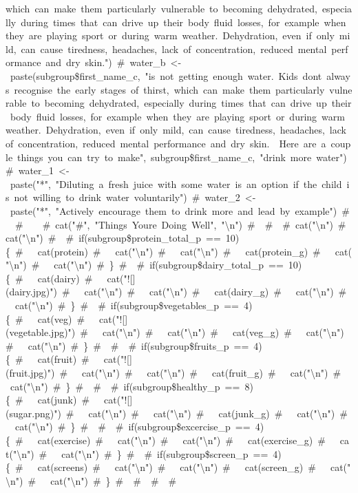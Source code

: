 \documentclass[]{article}
\begin{document}
which\ can\ make\ them\ particularly\ vulnerable\ to\ becoming\ dehydrated,\ especially\ during\ times\ that\ can\ drive\ up\ their\ body\ fluid\ losses,\ for\ example\ when\ they\ are\ playing\ sport\ or\ during\ warm\ weather.\ Dehydration,\ even\ if\ only\ mild,\ can\ cause\ tiredness,\ headaches,\ lack\ of\ concentration,\ reduced\ mental\ performance\ and\ dry\ skin.")\ \#\ water\_b\ \textless{}-\ paste(subgroup\$first\_name\_c,\ "is\ not\ getting\ enough\ water.\ Kids\ don\textquotesingle{}t\ always\ recognise\ the\ early\ stages\ of\ thirst,\ which\ can\ make\ them\ particularly\ vulnerable\ to\ becoming\ dehydrated,\ especially\ during\ times\ that\ can\ drive\ up\ their\ body\ fluid\ losses,\ for\ example\ when\ they\ are\ playing\ sport\ or\ during\ warm\ weather.\ Dehydration,\ even\ if\ only\ mild,\ can\ cause\ tiredness,\ headaches,\ lack\ of\ concentration,\ reduced\ mental\ performance\ and\ dry\ skin.\ \ Here\ are\ a\ couple\ things\ you\ can\ try\ to\ make",\ subgroup\$first\_name\_c,\ "drink\ more\ water")\ \#\ water\_1\ \textless{}-\ paste("*",\ "Diluting\ a\ fresh\ juice\ with\ some\ water\ is\ an\ option\ if\ the\ child\ is\ not\ willing\ to\ drink\ water\ voluntarily")\ \#\ water\_2\ \textless{}-\ paste("*",\ "Actively\ encourage\ them\ to\ drink\ more\ and\ lead\ by\ example")\ \#\ \ \#\ \ \ \ \#\ cat("\#",\ "Things\ You\textquotesingle{}re\ Doing\ Well",\ "\textbackslash{}n")\ \#\ \ \#\ \ \#\ cat("\textbackslash{}n")\ \#\ cat("\textbackslash{}n")\ \#\ \ \#\ if(subgroup\$protein\_total\_p\ ==\ 10)\{\ \#\ \ \ cat(protein)\ \#\ \ \ cat("\textbackslash{}n")\ \#\ \ \ cat("\textbackslash{}n")\ \#\ \ \ cat(protein\_g)\ \#\ \ \ cat("\textbackslash{}n")\ \#\ \ \ cat("\textbackslash{}n")\ \#\ \}\ \#\ \ \#\ if(subgroup\$dairy\_total\_p\ ==\ 10)\{\ \#\ \ \ cat(dairy)\ \#\ \ \ cat("!{[}{]}(dairy.jpg)")\ \#\ \ \ cat("\textbackslash{}n")\ \#\ \ \ cat("\textbackslash{}n")\ \#\ \ \ cat(dairy\_g)\ \#\ \ \ cat("\textbackslash{}n")\ \#\ \ \ cat("\textbackslash{}n")\ \#\ \}\ \#\ \ \#\ if(subgroup\$vegetables\_p\ ==\ 4)\{\ \#\ \ \ cat(veg)\ \#\ \ \ cat("!{[}{]}(vegetable.jpg)")\ \#\ \ \ cat("\textbackslash{}n")\ \#\ \ \ cat("\textbackslash{}n")\ \#\ \ \ cat(veg\_g)\ \#\ \ \ cat("\textbackslash{}n")\ \#\ \ \ cat("\textbackslash{}n")\ \#\ \}\ \#\ \ \#\ \ \#\ if(subgroup\$fruits\_p\ ==\ 4)\{\ \#\ \ \ cat(fruit)\ \#\ \ \ cat("!{[}{]}(fruit.jpg)")\ \#\ \ \ cat("\textbackslash{}n")\ \#\ \ \ cat("\textbackslash{}n")\ \#\ \ \ cat(fruit\_g)\ \#\ \ \ cat("\textbackslash{}n")\ \#\ \ \ cat("\textbackslash{}n")\ \#\ \}\ \#\ \ \#\ \ \#\ if(subgroup\$healthy\_p\ ==\ 8)\{\ \#\ \ \ cat(junk)\ \#\ \ \ cat("!{[}{]}(sugar.png)")\ \#\ \ \ cat("\textbackslash{}n")\ \#\ \ \ cat("\textbackslash{}n")\ \#\ \ \ cat(junk\_g)\ \#\ \ \ cat("\textbackslash{}n")\ \#\ \ \ cat("\textbackslash{}n")\ \#\ \}\ \#\ \ \#\ \ \#\ if(subgroup\$excercise\_p\ ==\ 4)\{\ \#\ \ \ cat(exercise)\ \#\ \ \ cat("\textbackslash{}n")\ \#\ \ \ cat("\textbackslash{}n")\ \#\ \ \ cat(exercise\_g)\ \#\ \ \ cat("\textbackslash{}n")\ \#\ \ \ cat("\textbackslash{}n")\ \#\ \}\ \#\ \ \#\ if(subgroup\$screen\_p\ ==\ 4)\{\ \#\ \ \ cat(screens)\ \#\ \ \ cat("\textbackslash{}n")\ \#\ \ \ cat("\textbackslash{}n")\ \#\ \ \ cat(screen\_g)\ \#\ \ \ cat("\textbackslash{}n")\ \#\ \ \ cat("\textbackslash{}n")\ \#\ \}\ \#\ \ \#\ \ \#\ \ \#\ 
\end{document}

